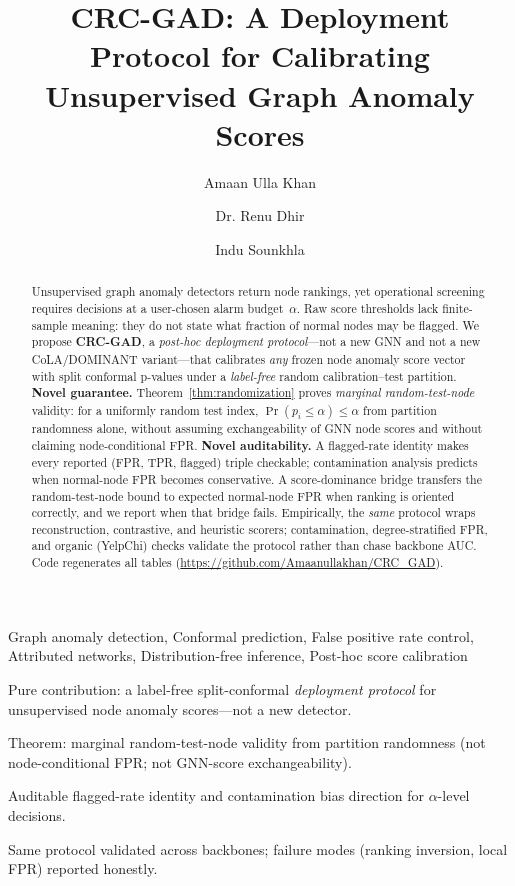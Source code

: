 \documentclass[a4paper]{cas-dc}
\theoremstyle{definition}
\begin{document}


\title[mode=title]{CRC-GAD: A Deployment Protocol for Calibrating Unsupervised Graph Anomaly Scores}

\author[1]{Amaan Ulla Khan}
\author[1]{Dr. Renu Dhir}
\author[1]{Indu Sounkhla}

\begin{abstract}
Unsupervised graph anomaly detectors return node rankings, yet operational screening requires decisions at a user-chosen alarm budget~$\alpha$.
Raw score thresholds lack finite-sample meaning: they do not state what fraction of normal nodes may be flagged.
We propose \textbf{CRC-GAD}, a \emph{post-hoc deployment protocol}---not a new GNN and not a new CoLA/DOMINANT variant---that calibrates \emph{any} frozen node anomaly score vector with split conformal p-values under a \emph{label-free} random calibration--test partition.
\textbf{Novel guarantee.} Theorem~\ref{thm:randomization} proves \emph{marginal random-test-node} validity: for a uniformly random test index, $\Pr(p_i\leq\alpha)\leq\alpha$ from partition randomness alone, without assuming exchangeability of GNN node scores and without claiming node-conditional FPR.
\textbf{Novel auditability.} A flagged-rate identity makes every reported (FPR, TPR, flagged) triple checkable; contamination analysis predicts when normal-node FPR becomes conservative.
A score-dominance bridge transfers the random-test-node bound to expected normal-node FPR when ranking is oriented correctly, and we report when that bridge fails.
Empirically, the \emph{same} protocol wraps reconstruction, contrastive, and heuristic scorers; contamination, degree-stratified FPR, and organic (YelpChi) checks validate the protocol rather than chase backbone AUC.
Code regenerates all tables (\url{https://github.com/Amaanullakhan/CRC_GAD}).
\end{abstract}

\begin{keywords}
Graph anomaly detection\sep
Conformal prediction\sep
False positive rate control\sep
Attributed networks\sep
Distribution-free inference\sep
Post-hoc score calibration
\end{keywords}

\begin{highlights}
\item Pure contribution: a label-free split-conformal \emph{deployment protocol} for unsupervised node anomaly scores---not a new detector.
\item Theorem: marginal random-test-node validity from partition randomness (not node-conditional FPR; not GNN-score exchangeability).
\item Auditable flagged-rate identity and contamination bias direction for $\alpha$-level decisions.
\item Same protocol validated across backbones; failure modes (ranking inversion, local FPR) reported honestly.
\end{highlights}
\end{document}
